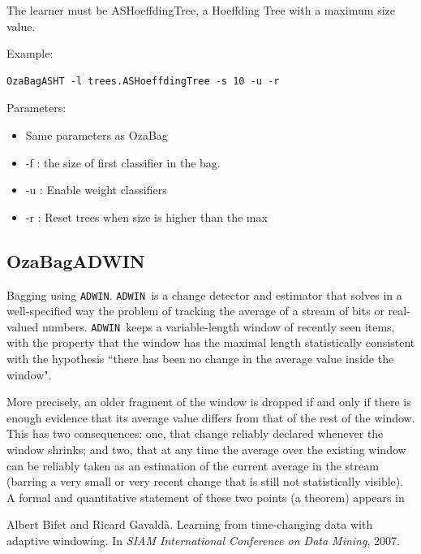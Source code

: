 \documentclass[a4paper,12pt,twoside]{book}
\begin{document}
The learner must be ASHoeffdingTree, a Hoeffding Tree with a maximum size value.

Example:
\begin{footnotesize}\begin{verbatim}
OzaBagASHT -l trees.ASHoeffdingTree -s 10 -u -r
\end{verbatim}\end{footnotesize}

Parameters:
\begin{itemize}
\item Same parameters as OzaBag
\item -f : the size of first classifier in the bag.
\item -u : Enable weight classifiers
\item -r : Reset trees when size is higher than the max
\end{itemize}

\def\adwin{{\tt ADWIN }}
\def\adwinb{{\tt ADWIN}}
\subsection{OzaBagADWIN} Bagging using \adwinb.
\adwin is a change detector and estimator that solves in a 
well-specified way the problem of tracking the average of a stream of bits or 
real-valued numbers. \adwin keeps a variable-length window of recently seen 
items, with the property that the window has the maximal length statistically 
consistent with the hypothesis ``there has been no change in the average value
inside the window". 

More precisely, an older fragment of the window is dropped if and only if 
there is enough evidence that its average value differs from that of 
the rest of the window. 
This has two consequences: one, that change reliably declared whenever
the window shrinks; and two, that at any time the average over the existing
window can be reliably taken as an estimation of the current average in the stream
(barring a very small or very recent change that is still not statistically 
visible). A formal and quantitative statement of these two points (a theorem)
appears in 

\begin{itemize}
Albert Bifet and Ricard Gavald{\`a}.
\newblock Learning from time-changing data with adaptive windowing.
\newblock In {\em SIAM International Conference on Data Mining}, 2007.\end{itemize}
\end{document}
